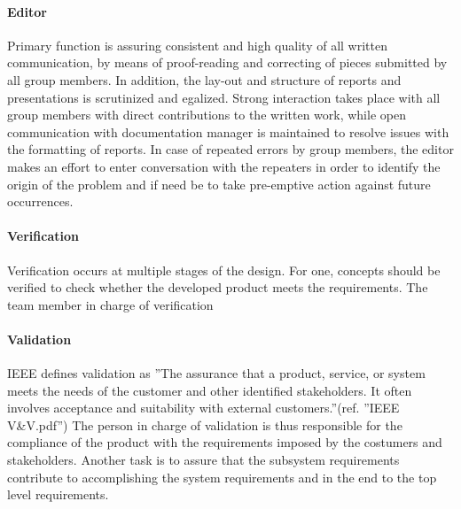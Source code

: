 \paragraph{Editor}
Primary function is assuring consistent and high quality of all written communication, by means of proof-reading and correcting of pieces submitted by all group members. In addition, the lay-out and structure of reports and presentations is scrutinized and egalized. Strong interaction takes place with all group members with direct contributions to the written work, while open communication with documentation manager is maintained to resolve issues with the formatting of reports. In case of repeated errors by group members, the editor makes an effort to enter conversation with the repeaters in order to identify the origin of the problem and if need be to take pre-emptive action against future occurrences.
\paragraph{Verification}
Verification occurs at multiple stages of the design. For one, concepts should be verified to check whether the developed product meets the requirements. The team member in charge of verification

\paragraph{Validation}
IEEE defines validation as ''The assurance that a product, service, or system meets the needs of the customer and other identified stakeholders. It often involves acceptance and suitability with external customers.''(ref. ''IEEE V\&V.pdf'') The person in charge of validation is thus responsible for the compliance of the product with the requirements imposed by the costumers and stakeholders. Another task is to assure that the subsystem requirements contribute to accomplishing the system requirements and in the end to the top level requirements.
